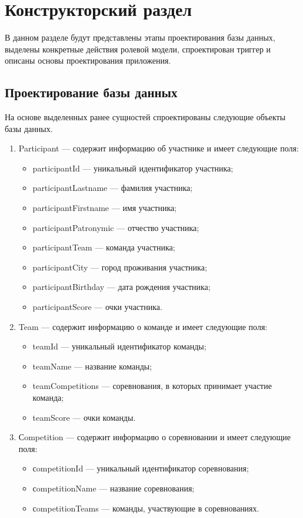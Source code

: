 \section{Конструкторский раздел} \label{desing}

В данном разделе будут представлены этапы проектирования базы данных, выделены конкретные действия ролевой модели, спроектирован триггер и описаны основы проектирования приложения.

\subsection{Проектирование базы данных}

На основе выделенных ранее сущностей спроектированы следующие объекты базы данных.
\begin{enumerate}	
	\item Participant --- содержит информацию об участнике и имеет следующие поля:
	\begin{itemize}[label=---]
		\item participantId --- уникальный идентификатор участника;
		\item participantLastname --- фамилия участника;
		\item participantFirstname --- имя участника;
		\item participantPatronymic --- отчество участника;
		\item participantTeam --- команда участника;
		\item participantCity ---  город проживания участника;
		\item participantBirthday --- дата рождения участника;
		\item participantScore --- очки участника.
	\end{itemize}
	
	\item Team --- содержит информацию о команде и имеет следующие поля:
	\begin{itemize}[label=---]
		\item teamId --- уникальный идентификатор команды;
		\item teamName --- название команды;
		\item teamCompetitions --- соревнования, в которых принимает участие команда;
		\item teamScore --- очки команды.
	\end{itemize}
		
	\item Сompetition --- содержит информацию о соревновании и имеет следующие поля:
	\begin{itemize}[label=---]
		\item сompetitionId --- уникальный идентификатор соревнования;
		\item сompetitionName --- название соревнования;
		\item сompetitionTeams --- команды, участвующие в соревнованиях. 
	\end{itemize}	
	

\end{enumerate}
